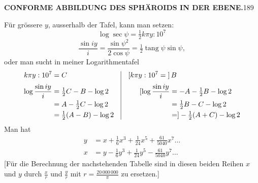 \par\clearpage
\noindent\null\hfill{\small\textbf{CONFORME ABBILDUNG DES SPHÄROIDS IN DER EBENE.}}\hfill189\par\medskip
Für grössere \(y\), ausserhalb der Tafel, kann man setzen:
\[\log\sec\psi=\tfrac12k\pi y:10^7\]
\[\frac{\sin iy}{i}=\frac{\sin\psi^2}{2\cos\psi}=\tfrac12\operatorname{tang}\psi\sin\psi,\]
\noindent oder man sucht in meiner Logarithmentafel
\[
\begin{array}{@{}r@{\quad}|@{\quad}l@{}}
\begin{aligned}
k\pi y:10^7&=C\\[3pt]
\log\frac{\sin iy}{i}&=\tfrac12C-B-\log2\\
&=A-\tfrac12C-\log2\\
&=\tfrac12(A-B)-\log2
\end{aligned}
&\begin{aligned}
\mathopen{[}k\pi y:10^7={}]&\,B\\[3pt]
[\log\frac{\sin iy}{i}&=-A-\tfrac12B-\log2\\
&=\tfrac12B-C-\log2\\
&=]-\tfrac12(A+C)-\log2
\end{aligned}
\end{array}
\]
Man hat
\[
\begin{aligned}
y&=x+\tfrac16x^3+\tfrac1{24}x^5+\tfrac{61}{5040}x^7\ldots\\
x&=y-\tfrac16y^3+\tfrac1{24}y^5-\tfrac{61}{5040}y^7\ldots
\end{aligned}
\]
[Für die Berechnung der nachstehenden Tabelle sind in diesen beiden Reihen \(x\) und \(y\) durch \(\frac{x}{r}\) und \(\frac{y}{r}\) mit \(r=\frac{20\,000\,000}{\pi}\) zu ersetzen.]
